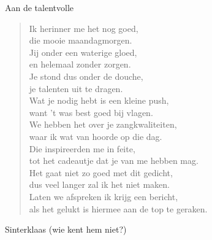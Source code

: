 \documentclass[12pt]{brief}
\date{4 december 2004}
\begin{document}
\begin{letter}{Aan de talentvolle}

\opening{}


\begin{verse}

Ik herinner me het nog goed,\\
die mooie maandagmorgen.\\
Jij onder een waterige gloed,\\
en helemaal zonder zorgen.\\[0.5em]

Je stond dus onder de douche,\\
je talenten uit te dragen.\\
Wat je nodig hebt is een kleine push,\\
want 't was best goed bij vlagen.\\[0.5em]

We hebben het over je zangkwaliteiten,\\
waar ik wat van hoorde op die dag.\\
Die inspireerden me in feite,\\
tot het cadeautje dat je van me hebben mag.\\[0.5em]

Het gaat niet zo goed met dit gedicht,\\
dus veel langer zal ik het niet maken.\\
Laten we afspreken ik krijg een bericht,\\
als het gelukt is hiermee aan de top te geraken.\\[3em]

\end{verse}


Sinterklaas (wie kent hem niet?)


\closing{}

\end{letter}
\end{document}
